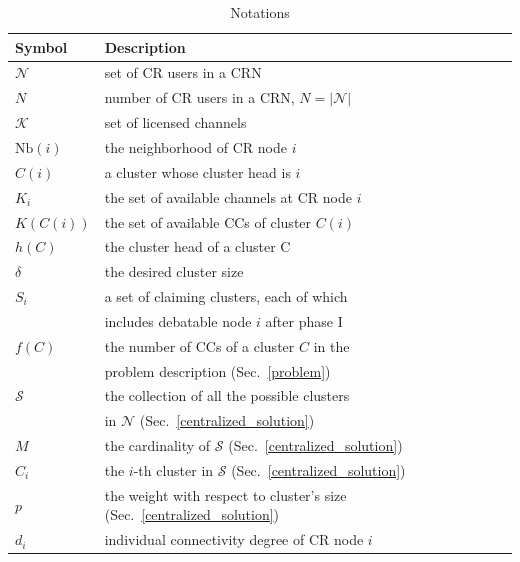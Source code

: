 \documentclass[times]{ettauth}
\theoremstyle{mytheoremstyle}
\theoremstyle{mytheoremstyle}
\theoremstyle{mytheoremstyle}
\begin{document}
\begin{table}[h!]
\caption{Notations}
\label{tab1}
\centering
\begin{tabular}{llr}
\toprule
Symbol & Description \\
\midrule
$\mathcal{N}$  & set of CR users in a CRN\\
$N$ & number of CR users in a CRN, $N=|\mathcal{N}|$\\
$\mathcal{K}$	& set of licensed channels\\
$\text{Nb}(i)$ & the neighborhood of CR node $i$    \\
$C(i)$ & a cluster whose cluster head is $i$  \\
$K_i$   & the set of available channels at CR node $i$  \\
$K(C(i))$   & the set of available CCs of cluster $C(i)$ \\
$h(C)$ & the cluster head of a cluster C\\
$\delta$ & the desired cluster size\\
$S_i$ & a set of claiming clusters, each of which \\
& includes debatable node $i$ after phase I\\
$f(C)$ & the number of CCs of a cluster $C$ in the\\ 
& problem description (Sec.~\ref{problem})\\
 $\mathcal{S}$ & the collection of all the possible clusters \\
 & in $\mathcal{N}$ (Sec.~\ref{centralized_solution})\\
 $M$ & the cardinality of $\mathcal{S}$ (Sec.~\ref{centralized_solution})\\
 $C_i$  & the $i$-th cluster in $\mathcal{S}$ (Sec.~\ref{centralized_solution})\\
 $p$ & the weight with respect to cluster's size (Sec.~\ref{centralized_solution}) \\
 $d_i$  & individual connectivity degree of CR node $i$\\

\end{tabular}
\end{table}
\end{document}
